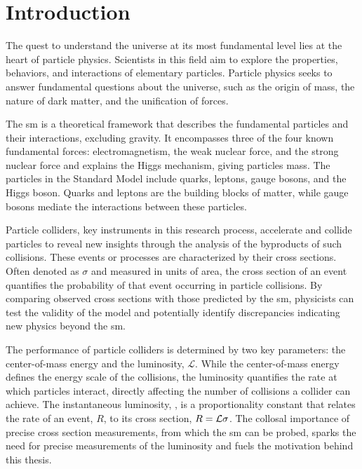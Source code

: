 \chapter{Introduction}


The quest to understand the universe at its most fundamental level lies at the heart of particle physics. Scientists in this field aim to explore the properties, behaviors, and interactions of elementary particles. Particle physics seeks to answer fundamental questions about the universe, such as the origin of mass, the nature of dark matter, and the unification of forces.


The \acrfull{sm} is a theoretical framework that describes the fundamental particles and their interactions, excluding gravity. It encompasses three of the four known fundamental forces: electromagnetism, the weak nuclear force, and the strong nuclear force and explains the Higgs mechanism, giving particles mass. The particles in the Standard Model include quarks, leptons, gauge bosons, and the Higgs boson. Quarks and leptons are the building blocks of matter, while gauge bosons mediate the interactions between these particles.

Particle colliders, key instruments in this research process, accelerate and collide particles to reveal new insights through the analysis of the byproducts of such collisions. These events or processes are characterized by their cross sections. Often denoted as $\sigma$ and measured in units of area, the cross section of an event quantifies the probability of that event occurring in particle collisions. By comparing observed cross sections with those predicted by the \acrshort{sm}, physicists can test the validity of the model and potentially identify discrepancies indicating new physics beyond the \acrshort{sm}.

The performance of particle colliders is determined by two key parameters: the center-of-mass energy and the luminosity, $\mathcal{L}$. While the center-of-mass energy defines the energy scale of the collisions, the luminosity quantifies the rate at which particles interact, directly affecting the number of collisions a collider can achieve. The instantaneous luminosity, \ilum, is a proportionality constant that relates the rate of an event, $R$, to its cross section, $R = \mathcal{L} \sigma$. The collosal importance of precise cross section measurements, from which the \acrshort{sm} can be probed, sparks the need for precise measurements of the luminosity and fuels the motivation behind this thesis.

